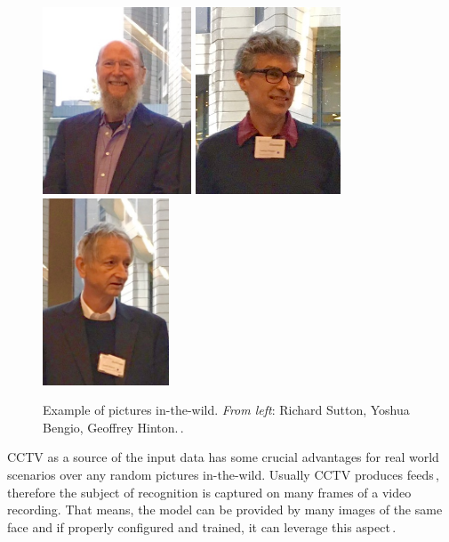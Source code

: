 \begin{figure}[ht]
    \centering
    \includegraphics[height=15em]{obrazky-figures/richard_sutton.jpg}
    \includegraphics[height=15em]{obrazky-figures/yoshua_bengio.jpg}
    \includegraphics[height=15em]{obrazky-figures/geoffrey_hinton.jpg}
    \caption[Example of pictures in{-}the{-}wild]{Example of pictures in{-}the{-}wild. \textit{From left}: Richard Sutton, Yoshua Bengio, Geoffrey Hinton.\,\cite{steve}.}
\end{figure}

CCTV as a source of the input data has some crucial advantages for real world scenarios over any random pictures in-the-wild. Usually CCTV produces feeds\,\cite{video}, therefore the subject of recognition is captured on many frames of a video recording. That means, the model can be provided by many images of the same face and if properly configured and trained, it can leverage this aspect\,\cite{biometricguide}.

